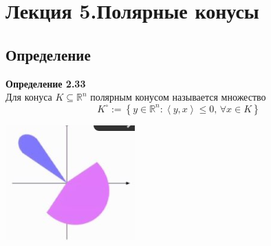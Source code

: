 \section{Лекция 5.Полярные конусы}
\subsection{Определение}
\noindent\textbf{Определение 2.33} \\

 Для конуса $K\subseteq \mathbb{R}^n$ полярным конусом называется множество
 \begin{equation*}
K^{\circ}:= \left\lbrace y \in \mathbb{R}^n : \left\langle y, x \right\rangle \leq 0  \text{, } \forall x \in K \right\rbrace
 \end{equation*}
 \begin{center}
 \includegraphics[scale=0.8]{image11.png}
 \end{center}
